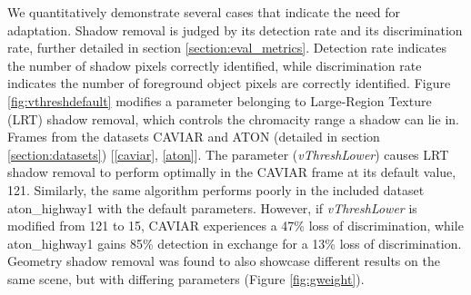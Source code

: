 \documentclass[12pt]{report}
\begin{document}
We quantitatively demonstrate several cases that indicate the need for adaptation. Shadow removal is judged by its detection rate and its discrimination rate, further detailed in section \ref{section:eval_metrics}. Detection rate indicates the number of shadow pixels correctly identified, while discrimination rate indicates the number of foreground object pixels are correctly identified. Figure \ref{fig:vthreshdefault} modifies a parameter belonging to Large-Region Texture (LRT) shadow removal, which controls the chromacity range a shadow can lie in. Frames from the datasets CAVIAR and ATON (detailed in section \ref{section:datasets}) [\ref{caviar}, \ref{aton}]. The parameter (\textit{vThreshLower}) causes LRT shadow removal to perform optimally in the CAVIAR frame at its default value, 121. Similarly, the same algorithm performs poorly in the included dataset aton\_highway1 with the default parameters. However, if \textit{vThreshLower} is modified from 121 to 15, CAVIAR experiences a 47\% loss of discrimination, while aton\_highway1 gains 85\% detection in exchange for a 13\% loss of discrimination. Geometry shadow removal was found to also showcase different results on the same scene, but with differing parameters (Figure \ref{fig:gweight}). 

\end{document}
